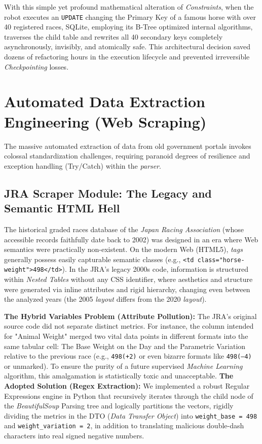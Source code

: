 \documentclass[12pt,a4paper]{article}
\begin{document}
With this simple yet profound mathematical alteration of \textit{Constraints}, when the robot executes an \texttt{UPDATE} changing the Primary Key of a famous horse with over 40 registered races, SQLite, employing its B-Tree optimized internal algorithms, traverses the child table and rewrites all 40 secondary keys completely asynchronously, invisibly, and atomically safe. This architectural decision saved dozens of refactoring hours in the execution lifecycle and prevented irreversible \textit{Checkpointing} losses.

\section{Automated Data Extraction Engineering (Web Scraping)}
The massive automated extraction of data from old government portals invokes colossal standardization challenges, requiring paranoid degrees of resilience and exception handling (Try/Catch) within the \textit{parser}.

\subsection{JRA Scraper Module: The Legacy and Semantic HTML Hell}
The historical graded races database of the \textit{Japan Racing Association} (whose accessible records faithfully date back to 2002) was designed in an era where Web semantics were practically non-existent. On the modern Web (HTML5), \textit{tags} generally possess easily capturable semantic classes (e.g., \texttt{<td class="horse-weight">498</td>}).
In the JRA's legacy 2000s code, information is structured within \textit{Nested Tables} without any CSS identifier, where aesthetics and structure were generated via inline attributes and rigid hierarchy, changing even between the analyzed years (the 2005 \textit{layout} differs from the 2020 \textit{layout}).

\textbf{The Hybrid Variables Problem (Attribute Pollution):} The JRA's original source code did not separate distinct metrics. For instance, the column intended for "Animal Weight" merged two vital data points in different formats into the same tabular cell: The Base Weight on the Day and the Parametric Variation relative to the previous race (e.g., \texttt{498(+2)} or even bizarre formats like \texttt{498(--4)} or unmarked).
To ensure the purity of a future supervised \textit{Machine Learning} algorithm, this amalgamation is statistically toxic and unacceptable.
\textbf{The Adopted Solution (Regex Extraction):} We implemented a robust Regular Expressions engine in Python that recursively iterates through the child node of the \textit{BeautifulSoup} Parsing tree and logically partitions the vectors, rigidly dividing the metrics in the DTO (\textit{Data Transfer Object}) into \texttt{weight\_base = 498} and \texttt{weight\_variation = 2}, in addition to translating malicious double-dash characters into real signed negative numbers.
\end{document}
